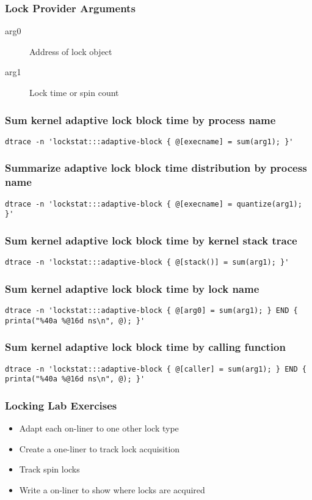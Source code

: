 \documentclass[pdftex]{beamer}
\begin{document}
\begin{frame}
  \frametitle{Lock Provider Arguments}
  \begin{description}
  \item[arg0] Address of lock object
  \item[arg1] Lock time or spin count
  \end{description}
\end{frame}

\begin{frame}[fragile]
  \frametitle{Sum kernel adaptive lock block time by process name}
\begin{verbatim}
dtrace -n 'lockstat:::adaptive-block { @[execname] = sum(arg1); }'
\end{verbatim}
\end{frame}

\begin{frame}[fragile]
\frametitle{Summarize adaptive lock block time distribution by process name}
\begin{verbatim}
dtrace -n 'lockstat:::adaptive-block { @[execname] = quantize(arg1); }'
\end{verbatim}
\end{frame}

\begin{frame}[fragile]
\frametitle{Sum kernel adaptive lock block time by kernel stack trace}
\begin{verbatim}
dtrace -n 'lockstat:::adaptive-block { @[stack()] = sum(arg1); }'
\end{verbatim}
\end{frame}

\begin{frame}[fragile]
\frametitle{Sum kernel adaptive lock block time by lock name}
\begin{verbatim}
dtrace -n 'lockstat:::adaptive-block { @[arg0] = sum(arg1); } END { printa("%40a %@16d ns\n", @); }'
\end{verbatim}  
\end{frame}

\begin{frame}[fragile]
\frametitle{Sum kernel adaptive lock block time by calling function}
\begin{verbatim}
dtrace -n 'lockstat:::adaptive-block { @[caller] = sum(arg1); } END { printa("%40a %@16d ns\n", @); }'
\end{verbatim}
\end{frame}

\begin{frame}
  \frametitle{Locking Lab Exercises}
  \begin{itemize}
  \item Adapt each on-liner to one other lock type
  \item Create a one-liner to track lock acquisition
  \item Track spin locks
  \item Write a on-liner to show where locks are acquired
  \end{itemize}
\end{frame}
\end{document}
